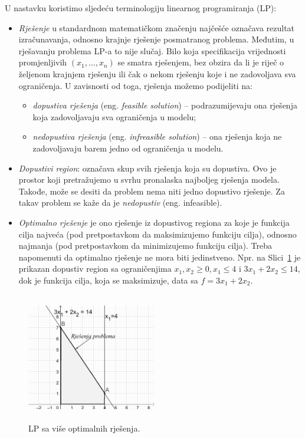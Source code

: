 \documentclass[b5paper, utf8, 11pt, colorlinks]{book}
\theoremstyle{definition}
\begin{document}
  U nastavku koristimo sljedeću terminologiju linearnog programiranja (LP):
 \begin{itemize}
     \item \emph{Rješenje} u standardnom matematičkom značenju najčešće označava rezultat izračunavanja, odnosno krajnje rješenje posmatranog problema. Međutim, u rješavanju problema LP-a to  nije slučaj. Bilo koja specifikacija vrijednosti promjenljivih  $(x_1,\ldots, x_n)$ se smatra rješenjem, bez obzira da li je riječ o željenom krajnjem rješenju ili čak o nekom rješenju koje i ne zadovoljava sva ograničenja. U zavisnosti od toga, rješenja  možemo podijeliti na:
     \begin{itemize}
         \item \emph{dopustiva rješenja} (eng. \emph{feasible solution}) -- podrazumijevaju ona rješenja koja zadovoljavaju sva ograničenja u modelu;
         \item \emph{nedopustiva rješenja} (eng. \emph{infreasible solution}) -- ona rješenja koja ne zadovoljavaju barem jedno od ograničenja u modelu. 
     \end{itemize}
   \item \emph{Dopustivi region}: označava skup svih rješenja koja su dopustiva. Ovo je prostor koji pretražujemo u svrhu pronalaska najboljeg rješenja modela. Takođe, može se desiti da problem nema niti jedno dopustivo rješenje. Za takav problem se kaže da je \emph{nedopustiv} (eng. infeasible). 
   \item \emph{Optimalno rješenje} je ono rješenje iz dopustivog regiona za koje je funkcija cilja najveća (pod pretpostavkom da maksimizujemo funkciju cilja), odnosno najmanja (pod pretpostavkom da minimizujemo funkciju cilja). Treba napomenuti da optimalno rješenje ne mora biti jedinstveno.  Npr. na Slici~\ref{fig:multi_solution} je prikazan dopustiv region sa ograničenjima $x_1, x_2 \geq 0, x_1 \leq 4 $ i $3 x_1 + 2 x_2 \leq 14$, dok je funkcija cilja, koja se maksimizuje, data sa $f = 3x_1 + 2 x_2$.  
  \end{itemize}
 
  \begin{figure}[!htb]
     \centering
     \includegraphics[width=160pt, height=160pt]{fig3.eps}
     \caption{LP sa više optimalnih rješenja.}
     \label{fig:multi_solution}
   \end{figure}
 
\end{document}
